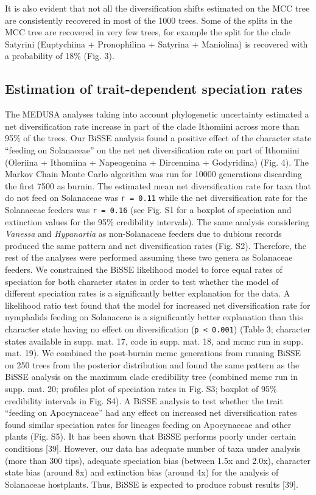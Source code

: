 \documentclass[10pt]{article}
\begin{document}
It is also evident that not all the diversification shifts estimated on
the MCC tree are consistently recovered in most of the 1000 trees. Some
of the splits in the MCC tree are recovered in very few trees, for
example the split for the clade Satyrini (Euptychiina + Pronophilina +
Satyrina + Maniolina) is recovered with a probability of 18\% (Fig. 3).

\subsection*{Estimation of trait-dependent speciation rates}

The MEDUSA analyses taking into account phylogenetic uncertainty
estimated a net diversification rate increase in part of the clade
Ithomiini across more than 95\% of the trees. Our BiSSE analysis found a
positive effect of the character state ``feeding on Solanaceae'' on the
net net diversification rate on part of Ithomiini (Oleriina + Ithomiina
+ Napeogenina + Dircennina + Godyridina) (Fig. 4). The Markov Chain
Monte Carlo algorithm was run for 10000 generations discarding the first
7500 as burnin. The estimated mean net diversification rate for taxa
that do not feed on Solanaceae was \texttt{r = 0.11} while the net
diversification rate for the Solanaceae feeders was \texttt{r = 0.16}
(see Fig. S1 for a boxplot of speciation and extinction values for the
95\% credibility intervals). The same analysis considering
\emph{Vanessa} and \emph{Hypanartia} as non-Solanaceae feeders due to
dubious records produced the same pattern and net diversification rates
(Fig. S2). Therefore, the rest of the analyses were performed assuming
these two genera as Solanaceae feeders. We constrained the BiSSE
likelihood model to force equal rates of speciation for both character
states in order to test whether the model of different speciation rates
is a significantly better explanation for the data. A likelihood ratio
test found that the model for increased net diversification rate for
nymphalids feeding on Solanaceae is a significantly better explanation
than this character state having no effect on diversification
(\texttt{p \textless{} 0.001}) (Table 3; character states available in
supp. mat. 17, code in supp. mat. 18, and mcmc run in supp. mat. 19). We
combined the post-burnin mcmc generations from running BiSSE on 250
trees from the posterior distribution and found the same pattern as the
BiSSE analysis on the maximum clade credibility tree (combined mcmc run
in supp. mat. 20; profiles plot of speciation rates in Fig. S3; boxplot
of 95\% credibility intervals in Fig. S4). A BiSSE analysis to test
whether the trait ``feeding on Apocynaceae'' had any effect on increased
net diversification rates found similar speciation rates for lineages
feeding on Apocynaceae and other plants (Fig. S5). It has been shown
that BiSSE performs poorly under certain conditions {[}39{]}. However,
our data has adequate number of taxa under analysis (more than 300
tips), adequate speciation bias (between 1.5x and 2.0x), character state
bias (around 8x) and extinction bias (around 4x) for the analysis of
Solanaceae hostplants. Thus, BiSSE is expected to produce robust results
{[}39{]}.
\end{document}
